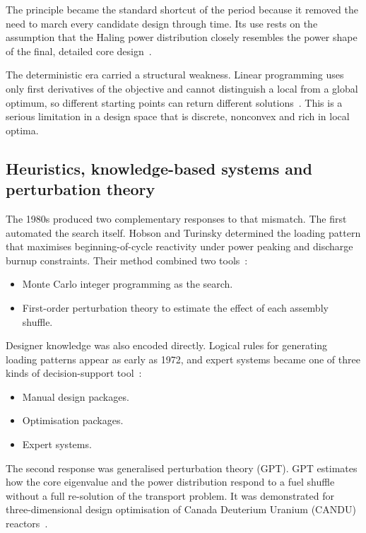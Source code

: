 The principle became the standard shortcut of the period because it
removed the need to march every candidate design through time. Its use
rests on the assumption that the Haling power distribution closely
resembles the power shape of the final, detailed core
design~\cite{downar_1988}.

The deterministic era carried a structural weakness. Linear programming
uses only first derivatives of the objective and cannot distinguish a
local from a global optimum, so different starting points can return
different solutions~\cite{downar_1988}. This is a serious limitation in
a design space that is discrete, nonconvex and rich in local optima.

\subsection{Heuristics, knowledge-based systems and perturbation
theory}
\label{sec:lit-opt-heuristic}

The 1980s produced two complementary responses to that mismatch. The
first automated the search itself. Hobson and Turinsky determined
the loading pattern that maximises beginning-of-cycle reactivity under
power peaking and discharge burnup constraints. Their method combined
two tools~\cite{hobson_turinsky_1986}:

\begin{itemize}
  \item Monte Carlo integer programming as the search.

  \item First-order perturbation theory to estimate the effect of each
        assembly shuffle.
\end{itemize}

Designer knowledge was also encoded directly. Logical rules for
generating loading patterns appear as early as 1972, and expert systems
became one of three kinds of decision-support
tool~\cite{meneses_2010}:

\begin{itemize}
  \item Manual design packages.

  \item Optimisation packages.

  \item Expert systems.
\end{itemize}

The second response was generalised perturbation theory (GPT). GPT
estimates how the core eigenvalue and the power distribution respond to
a fuel shuffle without a full re-solution of the transport problem. It
was demonstrated for three-dimensional design optimisation of Canada
Deuterium Uranium (CANDU) reactors~\cite{rozon_beaudet_1992}.

